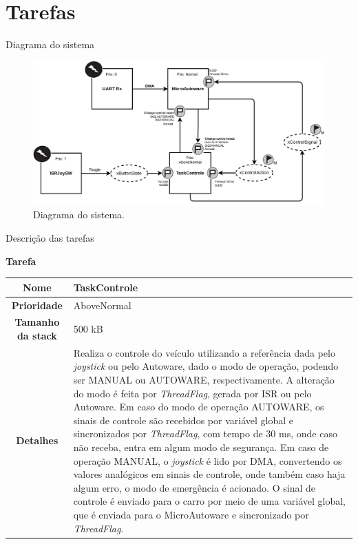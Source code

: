 \documentclass{if-beamer}
\begin{document}
\section{Tarefas}



\begin{frame}{Diagrama do sistema}
	
	\begin{figure}
		\centering
		\includegraphics[width=0.95\linewidth]{img/system_diagram}
		\caption{Diagrama do sistema.}
		\label{fig:systemdiagram}
	\end{figure}
	
\end{frame}



\begin{frame}{Descrição das tarefas}
	
\begin{block}{\textbf{Tarefa}}
	
	\centering
	
	\begin{tabular}{c|p{8cm}}
		\textbf{Nome} & TaskControle \\
		\hline
		\textbf{Prioridade}& AboveNormal \\
		\hline
		\textbf{Tamanho da stack} & 500 kB \\
		\hline
		\textbf{Detalhes} & Realiza o controle do veículo utilizando a referência dada pelo \textit{joystick} ou pelo Autoware, dado o modo de operação, podendo ser MANUAL ou AUTOWARE, respectivamente. A alteração do modo é feita por \textit{ThreadFlag}, gerada por ISR ou pelo Autoware. Em caso do modo de operação AUTOWARE, os sinais de controle são recebidos por variável global e sincronizados por \textit{ThreadFlag}, com tempo de 30 ms, onde caso não receba, entra em algum modo de segurança. Em caso de operação MANUAL,  o \textit{joystick} é lido por DMA, convertendo os valores analógicos em sinais de controle, onde também caso haja algum erro, o modo de emergência é acionado. O sinal de controle é enviado para o carro por meio de uma variável global, que é enviada para o MicroAutoware e sincronizado por \textit{ThreadFlag}. \\
	\end{tabular}
	
\end{block}	
	
\end{frame}
\end{document}
